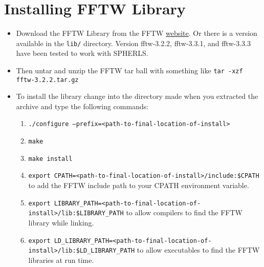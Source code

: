 \documentclass[12pt,a4paper]{book}
\begin{document}
\section{Installing FFTW Library}
\begin{itemize}
\item Download the FFTW Library from the FFTW \href{http://www.fftw.org/download.html}{website}. Or there is a version available in the {\tt lib/} directory. Version fftw-3.2.2, fftw-3.3.1, and fftw-3.3.3 have been tested to work with SPHERLS.
\item Then untar and unzip the FFTW tar ball with something like {\tt tar -xzf fftw-3.2.2.tar.gz}
\item To install the library change into the directory made when you extracted the archive and type the following commands:
\begin{enumerate}
\item {\tt ./configure --prefix\-=<path-to-final-location-of-install>}
\item {\tt make}
\item {\tt make install}
\item {\tt export CPATH=<path-to-final-location-of-install>/include:\$CPATH} to add the FFTW include path to your CPATH environment variable.
\item {\tt export LIBRARY\_PATH=<path-to-final-location-of-install>/lib:\$LIBRARY\_PATH} to allow compilers to find the FFTW library while linking.
\item {\tt export LD\_LIBRARY\_PATH=<path-to-final-location-of-install>/lib:\$LD\_LIBRARY\_PATH} to allow executables to find the FFTW libraries at run time.
\end{enumerate}
\end{itemize}
\end{document}
